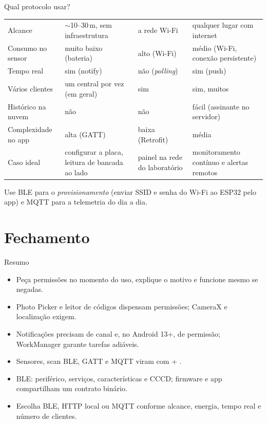 \documentclass[aspectratio=169,10pt]{beamer}
\begin{document}
\begin{frame}{Qual protocolo usar?}
  \footnotesize
  \begin{tabularx}{\textwidth}{@{}l L L L@{}}
    \toprule
    &  &  &  \\
    \midrule
    Alcance & $\sim$10--30\,m, sem infraestrutura & a rede Wi-Fi & qualquer lugar com internet \\
    Consumo no sensor & muito baixo (bateria) & alto (Wi-Fi) & médio (Wi-Fi, conexão persistente) \\
    Tempo real & sim (notify) & não (\emph{polling}) & sim (push) \\
    Vários clientes & um central por vez (em geral) & sim & sim, muitos \\
    Histórico na nuvem & não & não & fácil (assinante no servidor) \\
    Complexidade no app & alta (GATT) & baixa (Retrofit) & média \\
    Caso ideal & configurar a placa, leitura de bancada ao lado & painel na rede do laboratório & monitoramento contínuo e alertas remotos \\
    \bottomrule
  \end{tabularx}
  \vspace{4pt}
  \begin{dica}
    Use BLE para o \emph{provisionamento} (enviar SSID e senha do Wi-Fi ao ESP32 pelo app) e MQTT para a telemetria do dia a dia.
  \end{dica}
\end{frame}

\section{Fechamento}

\begin{frame}{Resumo}
  \begin{resumo}
    \begin{itemize}
      \item Peça permissões no momento do uso, explique o motivo e funcione mesmo se negadas.
      \item Photo Picker e leitor de códigos dispensam permissões; CameraX e localização exigem.
      \item Notificações precisam de canal e, no Android 13+, de permissão; WorkManager garante tarefas adiáveis.
      \item Sensores, scan BLE, GATT e MQTT viram  com  + .
      \item BLE: periférico, serviços, características e CCCD; firmware e app compartilham um contrato binário.
      \item Escolha BLE, HTTP local ou MQTT conforme alcance, energia, tempo real e número de clientes.
    \end{itemize}
  \end{resumo}
\end{frame}
\end{document}
